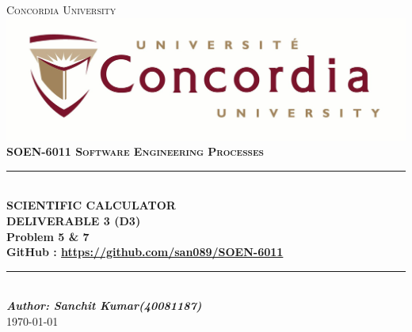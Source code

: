 \documentclass[a4paper,12pt]{article}
\newcommand{\Author}{Sanchit Kumar(40081187)}
\newcommand{\Course}{\textbf{SOEN-6011 \vspace{0.5cm} Software Engineering Processes}}
\begin{document}

\begin{titlepage}
\newcommand{\HRule}{\rule{\linewidth}{0.5mm}} %


\centering
\textsc{\LARGE Concordia University} \\ [5mm] 
\includegraphics[scale=.1]{University_logo.jpg}\\[1cm] 
\textsc{\Large \Course} \\ [0.5cm]

	
\HRule \\[0.4cm]
{ \huge \bfseries SCIENTIFIC CALCULATOR }\\[0.4cm] 
{\large \textbf{DELIVERABLE 3 (D3)} } \\ [0.2cm] 
{\large \textbf{Problem 5 \& 7} } \\ [0.2cm]
{\large \textbf{GitHub : \url{https://github.com/san089/SOEN-6011}}}	
\HRule \\[1.5cm]


\vspace{7cm}
\Large \emph{\textbf{Author: \Author}}\\
{\large \today}\\[2cm]

\vfill
\end{titlepage}	
\end{document}
